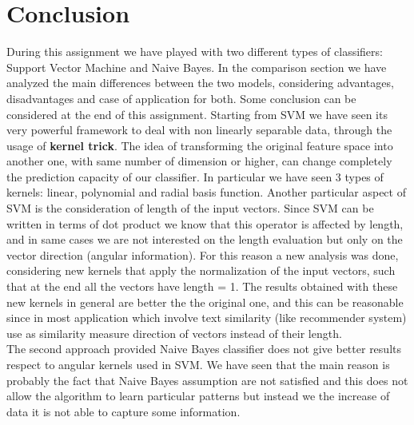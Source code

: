 \documentclass[11pt,a4paper]{article}
\begin{document}
\section{Conclusion}
During this assignment we have played with two different types of classifiers: Support Vector Machine and Naive Bayes. In the comparison section we have analyzed the main differences between the two models, considering advantages, disadvantages and case of application for both. Some conclusion can be considered at the end of this assignment. Starting from SVM we have seen its very powerful framework to deal with non linearly separable data, through the usage of \textbf{kernel trick}. The idea of transforming the original feature space into another one, with same number of dimension or higher, can change completely the prediction capacity of our classifier. In particular we have seen 3 types of kernels: linear, polynomial and radial basis function. Another particular aspect of SVM is the consideration of length of the input vectors. Since SVM can be written in terms of dot product we know that this operator is affected by length, and in same cases we are not interested on the length evaluation but only on the vector direction (angular information). For this reason a new analysis was done, considering new kernels that apply the normalization of the input vectors, such that at the end all the vectors have length = 1. The results obtained with these new kernels in general are better the the original one, and this can be reasonable since in most application which involve text similarity (like recommender system) use as similarity measure direction of vectors instead of their length.\\
The second approach provided Naive Bayes classifier does not give better results respect to angular kernels used in SVM. We have seen that the main reason is probably the fact that Naive Bayes assumption are not satisfied and this does not allow the algorithm to learn particular patterns but instead we the increase of data it is not able to capture some information.  
\end{document}
